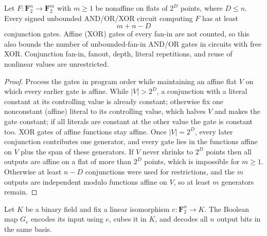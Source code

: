 \begin{theorem}
  \label{thm:lowerbounds-algebraic-geometry-restriction-rank}
  \leanok
  Let $F:\mathbf F_2^n\to\mathbf F_2^m$ with $m\ge1$ be nonaffine on flats of $2^D$
  points, where $D\le n$. Every signed unbounded AND/OR/XOR circuit computing $F$
  has at least
  \[
    m+n-D
  \]
  conjunction gates. Affine (XOR) gates of every fan-in are not counted, so this
  also bounds the number of unbounded-fan-in AND/OR gates in circuits with free
  XOR. Conjunction fan-in, fanout, depth, literal repetitions, and reuse of
  nonlinear values are unrestricted.
\end{theorem}
\begin{proof}
  \leanok
  Process the gates in program order while maintaining an affine flat $V$ on
  which every earlier gate is affine. While $|V|>2^D$, a conjunction with a literal
  constant at its controlling value is already constant; otherwise fix one
  nonconstant (affine) literal to its controlling value, which halves $V$ and makes
  the gate constant; if all literals are constant at the other value the gate is
  constant too. XOR gates of affine functions stay affine. Once $|V|=2^D$, every
  later conjunction contributes one generator, and every gate lies in the functions
  affine on $V$ plus the span of these generators. If $V$ never shrinks to $2^D$
  points then all outputs are affine on a flat of more than $2^D$ points, which is
  impossible for $m\ge1$. Otherwise at least $n-D$ conjunctions were used for
  restrictions, and the $m$ outputs are independent modulo functions affine on $V$,
  so at least $m$ generators remain.
\end{proof}

\begin{definition}
  \label{def:lowerbounds-algebraic-geometry-gold}
  \leanok
  Let $K$ be a binary field and fix a linear isomorphism
  $e:\mathbf F_2^n\longrightarrow K$. The Boolean map $G_e$ encodes its input using
  $e$, cubes it in $K$, and decodes all $n$ output bits in the same basis.
\end{definition}

